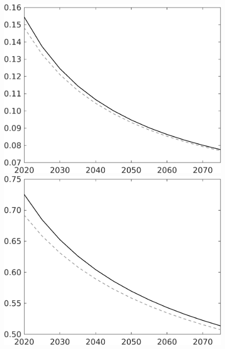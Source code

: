\begin{figure}[h!!]
\begin{minipage}[]{0.32\textwidth}
	\end{minipage}		
	\begin{minipage}[]{0.32\textwidth}
		\includegraphics[width=1\textwidth]{../../codding_model/own_basedOnFried/optimalPol_010922_revision/figures/all_13Sept22/CompTaul_Reg0_sg_spillover0_nsk0_xgr0_sep1_LFlimit0_emsbase1_countec0_GovRev1_etaa0.79_lgd0.png}
	\end{minipage}	
	\begin{minipage}[]{0.32\textwidth}
		\includegraphics[width=1\textwidth]{../../codding_model/own_basedOnFried/optimalPol_010922_revision/figures/all_13Sept22/CompTaul_Reg0_sn_spillover0_nsk0_xgr0_sep1_LFlimit0_emsbase1_countec0_GovRev1_etaa0.79_lgd0.png}

\end{minipage}
\end{figure}

